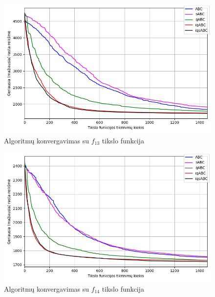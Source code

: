 \documentclass{VUMIFPSmagistrinis}
\begin{document}
\begin{landscape}
\begin{multicols}{2}
\begin{figure}[H]
    \centering
    \includegraphics[scale=0.45]{img/2kv/all_f13.jpg}
    \caption{Algoritmų konvergavimas su $f_{13}$ tikslo funkcija}
    \label{img:konf13}
\end{figure}

\begin{figure}[H]
    \centering
    \includegraphics[scale=0.45]{img/2kv/all_f14.jpg}
    \caption{Algoritmų konvergavimas su $f_{14}$ tikslo funkcija}
    \label{img:konf14}
\end{figure}


\end{multicols}


\end{landscape}
\end{document}
